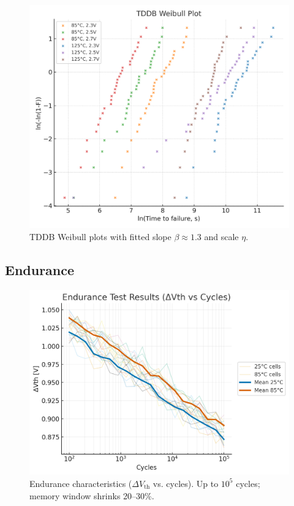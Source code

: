 \documentclass[conference]{IEEEtran}
\begin{document}
\begin{figure}[!t]
  \centering
  \includegraphics[width=0.95\linewidth]{figures/fig4_tddb_weibull.png}
  \caption{TDDB Weibull plots with fitted slope $\beta \approx 1.3$ and scale $\eta$.}
  \label{fig:tddb_weibull}
\end{figure}

\subsection{Endurance}
\begin{figure}[!t]
  \centering
  \includegraphics[width=0.95\linewidth]{figures/fig5_endurance.png}
  \caption{Endurance characteristics ($\Delta V_{\mathrm{th}}$ vs. cycles). Up to $10^5$ cycles; memory window shrinks 20--30\%.}
  \label{fig:endurance}
\end{figure}
\end{document}
